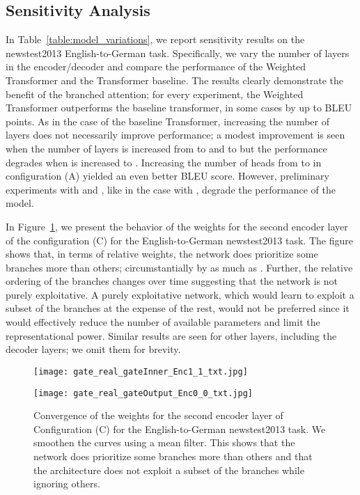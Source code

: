 \documentclass{article} \usepackage{iclr2018_conference,times}
\newcommand{\name}{Weighted Transformer\xspace}
\begin{document}
\subsection{Sensitivity Analysis}
In Table~\ref{table:model_variations}, we report sensitivity results on the newstest2013 English-to-German task. Specifically, we vary the number of layers in the encoder/decoder and compare the performance of the \name and the Transformer baseline. The results clearly demonstrate the benefit of the branched attention; for every experiment, the \name outperforms the baseline transformer, in some cases by up to  BLEU points. As in the case of the baseline Transformer, increasing the number of layers does not necessarily improve performance; a modest improvement is seen when the number of layers  is increased from  to  and  to  but the performance degrades when  is increased to . Increasing the number of heads from  to  in configuration (A) yielded an even better BLEU score. However, preliminary experiments with  and , like in the case with , degrade the performance of the model. 



















In Figure~\ref{fig:conv}, we present the behavior of the weights  for the second encoder layer of the configuration (C) for the English-to-German newstest2013 task. The figure shows that, in terms of relative weights, the network does prioritize some branches more than others; circumstantially by as much as . Further, the relative ordering of the branches changes over time suggesting that the network is not purely exploitative. A purely exploitative network, which would learn to exploit a subset of the branches at the expense of the rest, would not be preferred since it would effectively reduce the number of available parameters and limit the representational power. Similar results are seen for other layers, including the decoder layers; we omit them for brevity. 


\begin{figure}

  \centering
\parbox{6.5cm}{
    \texttt{[image: gate\_real\_gateInner\_Enc1\_1\_txt.jpg]}
}
\parbox{6.5cm}{
  \texttt{[image: gate\_real\_gateOutput\_Enc0\_0\_txt.jpg]}
}
\caption{Convergence of the  weights for the second encoder layer of Configuration (C) for the English-to-German newstest2013 task. We smoothen the curves using a mean filter. This shows that the network does prioritize some branches more than others and that the architecture does not exploit a subset of the branches while ignoring others.\label{fig:conv}} 
\end{figure}
\end{document}

